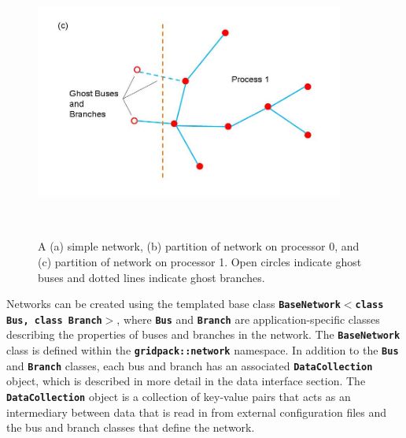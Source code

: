 \begin{figure}
    \includegraphics*[width=4in, height=3.55in, keepaspectratio=true]{figures/Partition1}
  \caption{ A (a) simple network, (b) partition of network on processor 0, and (c) partition of network on processor 1. Open circles indicate ghost buses and dotted lines indicate ghost branches.}
  \label{fig:partition}
\end{figure}





Networks can be created using the templated base class \texttt{\textbf{BaseNetwork$\boldsymbol{\mathrm{<}}$class Bus, class Branch$\boldsymbol{\mathrm{>}}$}}, where \texttt{\textbf{Bus}} and \texttt{\textbf{Branch}} are application-specific classes describing the properties of buses and branches in the network. The \texttt{\textbf{BaseNetwork}} class is defined within the \texttt{\textbf{gridpack::network}} namespace. In addition to the \texttt{\textbf{Bus}} and \texttt{\textbf{Branch}} classes, each bus and branch has an associated \texttt{\textbf{DataCollection}} object, which is described in more detail in the data interface section. The \texttt{\textbf{DataCollection}} object is a collection of key-value pairs that acts as an intermediary between data that is read in from external configuration files and the bus and branch classes that define the network.

